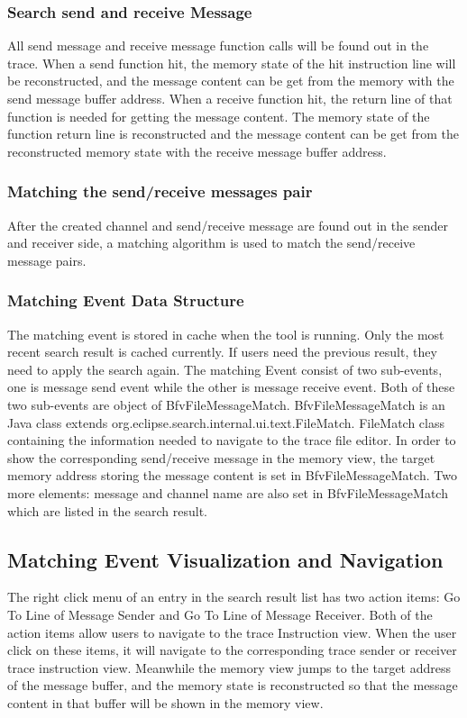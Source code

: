 \documentclass[paper=a4, fontsize=11pt]{scrartcl}
\numberwithin{equation}{section}		%
\numberwithin{figure}{section}			%
\numberwithin{table}{section}				%
\begin{document}
\subsubsection{Search send and receive Message}
All send message and receive message function calls will be found out in the trace. When a send function hit, the memory state of the hit instruction line will be reconstructed, and the message content can be get from the memory with the send message buffer address. When a receive function hit, the return line of that function is needed for getting the message content. The memory state of the function return line is reconstructed and the message content can be get  from the reconstructed memory state with the receive message buffer address.
\subsubsection{Matching the send/receive messages pair}
After the created channel and send/receive message are found out in the sender and receiver side, a matching algorithm is used to match the send/receive message pairs.
\subsubsection{Matching Event Data Structure}
The matching event is stored in cache when the tool is running. Only the most recent search result is cached currently. If users need the previous result, they need to apply the search again. The matching Event consist of two sub-events, one is message send event while the other is message receive event. Both of these two sub-events are object of BfvFileMessageMatch. BfvFileMessageMatch is an Java class extends org.eclipse.search.internal.ui.text.FileMatch. FileMatch class containing the information needed to navigate to the trace file editor. In order to show the corresponding send/receive message in the memory view, the target memory address storing the message content is set in BfvFileMessageMatch. Two more elements: message and channel name are also set in BfvFileMessageMatch which are listed in the search result. 

\subsection{Matching Event Visualization and Navigation}
The right click menu of an entry in the search result list has two action items: Go To Line of Message Sender and Go To Line of Message Receiver. Both of the action items allow users to navigate to the trace Instruction view. When the user click on these items, it will navigate to the corresponding trace sender or receiver trace instruction view.  Meanwhile the memory view jumps to the target address of the message buffer, and the memory state is reconstructed so that the message content in that buffer will be shown in the memory view.
\end{document}

